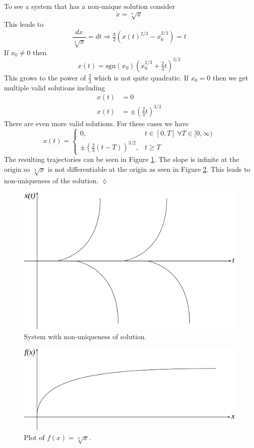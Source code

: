 \begin{example}
To see a system that has a non-unique solution consider
$$\dot{x} = \sqrt[3]{x}$$
This leads to
$$\frac{dx}{\sqrt[3]{x}} = dt \Rightarrow \tfrac{3}{2}\left(x(t)^{2/3}-x_0^{2/3}\right) = t$$
If $x_0\neq0$ then
$$x(t) = \text{sgn}(x_0)\left(x_0^{2/3}+\tfrac{2}{3}t\right)^{3/2}$$
This grows to the power of $\frac{3}{2}$ which is not quite quadratic. If $x_0=0$ then we get multiple valid solutions including
\begin{align*}
x(t) &= 0 \\
x(t) &= \pm(\tfrac{2}{3}t)^{3/2}
\end{align*}
There are even more valid solutions. For these cases we have
$$x(t) = \begin{cases} 0, & t\in[0,T] ~\forall T\in[0,\infty) \\ \pm(\tfrac{2}{3}(t-T))^{3/2}, & t\geq T \end{cases}$$
The resulting trajectories can be seen in Figure \ref{fig:04multsols}. The slope is infinite at the origin so $\sqrt[3]{x}$ is not differentiable at the origin as seen in Figure \ref{fig:04infslope}. This leads to non-uniqueness of the solution.
$\lozenge$
\end{example}

\begin{figure}[ht!]
	\centering
	\includegraphics[width=.5\textwidth]{images/04multsols}
	\caption{System with non-uniqueness of solution.}
	\label{fig:04multsols}
\end{figure}

\begin{figure}[ht!]
	\centering
	\includegraphics[width=.5\textwidth]{images/04infslope}
	\caption{Plot of $f(x) = \sqrt[3]{x}$.}
	\label{fig:04infslope}
\end{figure}


